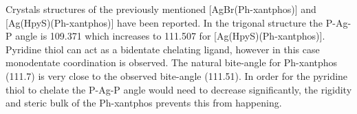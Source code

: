 
Crystals structures of the previously mentioned  [AgBr(Ph-xantphos)] and [Ag(HpyS)(Ph-xantphos)] have been reported.  In the trigonal structure the P-Ag-P angle is 109.371\degrees{} which increases to 111.507\degrees{} for [Ag(HpyS)(Ph-xantphos)].  Pyridine thiol can act as a bidentate chelating ligand, however in this case monodentate coordination is observed.  The natural bite-angle for Ph-xantphos (111.7\degrees) is very close to the observed bite-angle (111.51\degrees).  In order for the pyridine thiol to chelate the P-Ag-P angle would need to decrease significantly, the rigidity and steric bulk of the Ph-xantphos prevents this from happening.\cite{Kaltzoglou2007}

